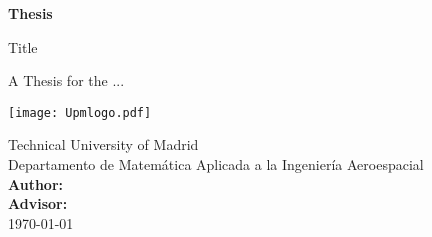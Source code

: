\begin{titlepage}
	\begin{center}
		\vspace*{3cm}
		\huge
		\textbf{Thesis}
		
		\vspace{0.5cm}
		\huge
		Title
		
		\vspace{1cm}
		\Large
		
		A Thesis for the ...\\
		\vspace{0.5cm}
		
		\texttt{[image: Upmlogo.pdf]}
				
				
		\vspace{0.8cm}
		\Large
		Technical University of Madrid\\
		Departamento de Matemática Aplicada a la Ingeniería Aeroespacial\\
		\vspace{0.8cm}
		\large
		\textbf{Author:} \\
		\flushleft
		\textbf{Advisor:}  \\
		\vspace{0.3cm}
		\centering
		\today
		
		
		
	\end{center}
\end{titlepage}